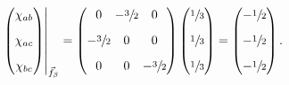 \begin{equation}
\left. \begin{pmatrix}
\chi_{ab}\\[.3cm]
\chi_{ac}\\[.3cm]
\chi_{bc}
\end{pmatrix} \right|_{\vec{f}_\beta}
=
 \begin{pmatrix}
0 & \!\!\!\! -\sfrac32 \!\!\!\! & 0 \\[.3cm]
-\sfrac32  & 0 & 0 \\[.3cm]
0 & 0 & -\sfrac32 
 \end{pmatrix}
 \begin{pmatrix}
\sfrac13 \\[.3cm]
\sfrac13\\[.3cm]
\sfrac13
\end{pmatrix} 
=
 \begin{pmatrix}
- \sfrac12 \\[.3cm]
- \sfrac12\\[.3cm]
- \sfrac12
\end{pmatrix}.
\label{mapping for raffle beta a}
\end{equation}

